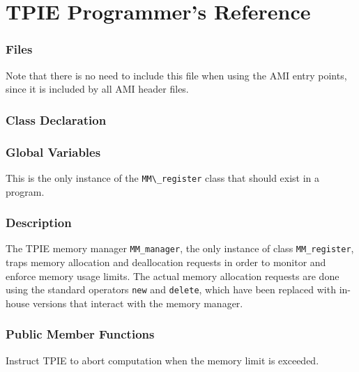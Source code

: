 \chapter{TPIE Programmer's Reference}


\subsection{Files}
  \btabb
     {Note that there is no need to
include this file when using the AMI entry points, since it is included by
all AMI header files.}
  \etabb

\subsection{Class Declaration}
  \btabb
     {}
  \etabb

\subsection{Global Variables}
  \btabb
     {This is the only instance of
the \lstinline|MM\_register| class that should exist in a program.}
  \etabb

\subsection{Description}
The TPIE memory manager \lstinline|MM_manager|, the only instance of class
\lstinline|MM_register|, traps memory allocation and deallocation requests in
order to monitor and enforce memory usage limits. The actual memory
allocation requests are done using the standard \CPP{} operators \lstinline|new|
and \lstinline|delete|, which have been replaced with in-house versions that
interact with the memory manager.

\subsection{Public Member Functions}
  \btabb

     {Instruct TPIE to
    abort computation when the memory limit is exceeded.}


